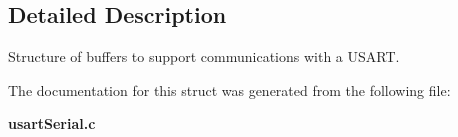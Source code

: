 \subsection{Detailed Description}
Structure of buffers to support communications with a U\+S\+A\+R\+T. 

The documentation for this struct was generated from the following file\+:\begin{DoxyCompactItemize}
\item 
{\bf usart\+Serial.\+c}\end{DoxyCompactItemize}
